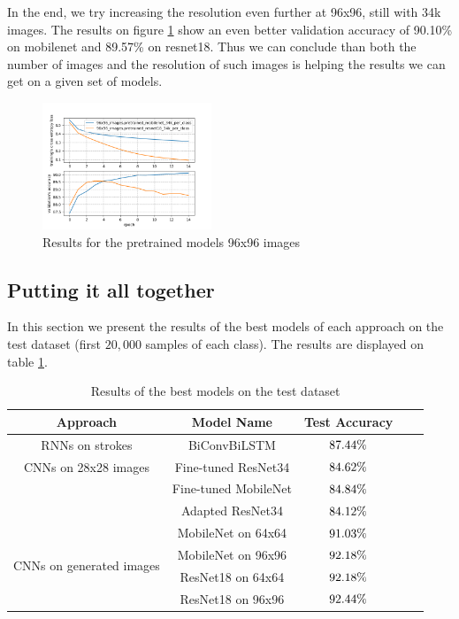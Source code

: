 \documentclass[10pt,twocolumn,letterpaper]{article}
\begin{document}
In the end, we try increasing the resolution even further at 96x96, still with 34k images. The results on figure \ref{fig:imgen_96} show an even better validation accuracy of 90.10\% on mobilenet and 89.57\% on resnet18. Thus we can conclude than both the number of images and the resolution of such images is helping the results we can get on a given set of models.

\begin{figure}[h] 
\centering
\includegraphics[width=0.45\textwidth]{images/imgen_96.png}
\caption{Results for the pretrained models 96x96 images}
\label{fig:imgen_96}
\end{figure}


\subsection{Putting it all together}

In this section we present the results of the best models of each approach on the test dataset (first $20,000$ samples of each class).
The results are displayed on table \ref{tab:final_results}.

\begin{table}[h]
    \centering
    \begin{tabular}{|c|c|c|c|c}
        \hline
          \textbf{Approach} & \textbf{Model Name} & \textbf{Test Accuracy}  \\
          \hline\hline
         RNNs on strokes & BiConvBiLSTM & $87.44\space \%$ \\
          \hline
         \multirow{1}{4em}{CNNs on 28x28 images} & Fine-tuned ResNet34 & $84.62\space \%$ \\
         & Fine-tuned MobileNet & $84.84\space \%$ \\
         & Adapted ResNet34 & $84.12\space \%$ \\
          \hline
         \multirow{4}{4em}{CNNs on generated images} & MobileNet on 64x64 & $91.03\space \%$ \\
         & MobileNet on 96x96 & $92.18\space \%$ \\
         & ResNet18 on 64x64 & $92.18\space \%$ \\
         & ResNet18 on 96x96 & $92.44\space \%$ \\
         \hline
    \end{tabular}
    \caption{Results of the best models on the test dataset}
    \label{tab:final_results}
\end{table}
\end{document}
